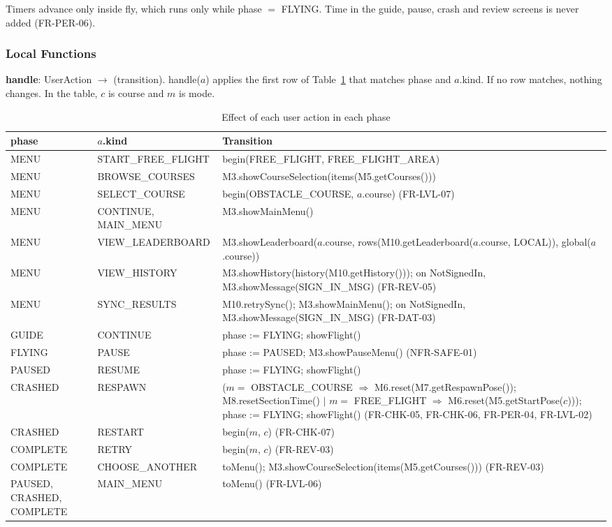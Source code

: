 \documentclass[12pt, titlepage]{article}
\begin{document}
Timers advance only inside fly, which runs only while phase $=$ FLYING. Time in
the guide, pause, crash and review screens is never added (FR-PER-06).

\subsubsection{Local Functions}

\noindent \textbf{handle}: UserAction $\rightarrow$ (transition). handle($a$)
applies the first row of Table~\ref{TblM4Handle} that matches phase and
$a$.kind. If no row matches, nothing changes. In the table, $c$ is course and
$m$ is mode.

\begin{table}[h!]
\centering
\small
\renewcommand{\arraystretch}{1.15}
\begin{tabularx}{\textwidth}{>{\raggedright\arraybackslash}p{2.3cm}
>{\raggedright\arraybackslash}p{4.3cm} >{\raggedright\arraybackslash}X}
\toprule
\textbf{phase} & \textbf{$a$.kind} & \textbf{Transition} \\
\midrule
MENU & START\_FREE\_FLIGHT & begin(FREE\_FLIGHT, FREE\_FLIGHT\_AREA) \\
MENU & BROWSE\_COURSES & M3.showCourseSelection(items(M5.getCourses())) \\
MENU & SELECT\_COURSE & begin(OBSTACLE\_COURSE, $a$.course) (FR-LVL-07) \\
MENU & CONTINUE, MAIN\_MENU & M3.showMainMenu() \\
MENU & VIEW\_LEADERBOARD & M3.showLeaderboard($a$.course,
rows(M10.getLeaderboard($a$.course, LOCAL)), global($a$.course)) \\
MENU & VIEW\_HISTORY & M3.showHistory(history(M10.getHistory())); on
NotSignedIn, M3.showMessage(SIGN\_IN\_MSG) (FR-REV-05) \\
MENU & SYNC\_RESULTS & M10.retrySync(); M3.showMainMenu(); on NotSignedIn,
M3.showMessage(SIGN\_IN\_MSG) (FR-DAT-03) \\
GUIDE & CONTINUE & phase := FLYING; showFlight() \\
FLYING & PAUSE & phase := PAUSED; M3.showPauseMenu() (NFR-SAFE-01) \\
PAUSED & RESUME & phase := FLYING; showFlight() \\
CRASHED & RESPAWN & ($m =$ OBSTACLE\_COURSE $\Rightarrow$
M6.reset(M7.getRespawnPose()); M8.resetSectionTime() $|$ $m =$ FREE\_FLIGHT
$\Rightarrow$ M6.reset(M5.getStartPose($c$))); phase := FLYING; showFlight()
(FR-CHK-05, FR-CHK-06, FR-PER-04, FR-LVL-02) \\
CRASHED & RESTART & begin($m$, $c$) (FR-CHK-07) \\
COMPLETE & RETRY & begin($m$, $c$) (FR-REV-03) \\
COMPLETE & CHOOSE\_ANOTHER & toMenu();
M3.showCourseSelection(items(M5.getCourses())) (FR-REV-03) \\
PAUSED, CRASHED, COMPLETE & MAIN\_MENU & toMenu() (FR-LVL-06) \\
\bottomrule
\end{tabularx}
\caption{Effect of each user action in each phase}
\label{TblM4Handle}
\end{table}
\end{document}

